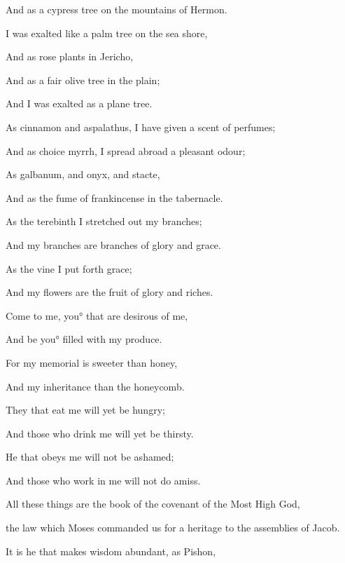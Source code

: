 {\par }{\Q And as a cypress tree on the mountains of Hermon.
\par }{\Q {}I was exalted like a palm tree on the sea shore,
\par }{\Q And as rose plants in Jericho,
\par }{\Q And as a fair olive tree in the plain;
\par }{\Q And I was exalted as a plane tree.
\par }{\Q {}As cinnamon and aspalathus, I have given a scent of perfumes;
\par }{\Q And as choice myrrh, I spread abroad a pleasant odour;
\par }{\Q As
 galbanum, and onyx, and stacte,
\par }{\Q And as the fume of frankincense in the tabernacle.
\par }{\Q {}As the terebinth I stretched out my branches;
\par }{\Q And my branches are branches of glory and grace.
\par }{\Q {}As the vine I put forth grace;
\par }{\Q And my flowers are the fruit of glory and riches.
\par }{\Q {}Come to me, you° that are desirous of me,
\par }{\Q And be you° filled with my produce.
\par }{\Q {}For my memorial is sweeter than honey,
\par }{\Q And my inheritance than the honeycomb.
\par }{\Q {}They that eat me will yet be hungry;
\par }{\Q And those who drink me will yet be thirsty.
\par }{\Q {}He that obeys me will not be ashamed;
\par }{\Q And those who work in me will not do amiss.
\par }{\BB \par }{\Q {}All these things are the book of the covenant of the Most High God,
\par }{ the law which Moses commanded us for a heritage to the assemblies of Jacob.
\par }{\Q {}It is he that makes wisdom abundant, as Pishon,
}
